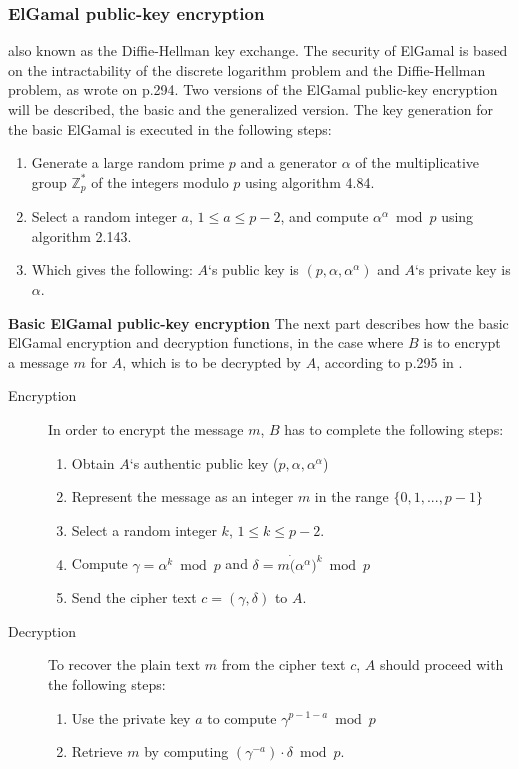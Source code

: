 \documentclass{acm_proc_article-sp}
\begin{document}
    \subsubsection{ElGamal public-key encryption}
    also known as the Diffie-Hellman key exchange. The security of ElGamal is based on the intractability of the discrete logarithm problem and the Diffie-Hellman problem, as \cite{handcrypt} wrote on p.294. Two versions of the ElGamal public-key encryption will be described, the basic and the generalized version. %
    The key generation for the basic ElGamal is executed in the following steps:
    \begin{enumerate} %
        \item Generate a large random prime $p$ and a generator $\alpha$ of the multiplicative group $\mathbb{Z}^*_p$ of the integers modulo $p$ using algorithm 4.84.
        \item Select a random integer $a$, $1 \leq a \leq p - 2$, and compute $\alpha^\alpha \bmod p$ using algorithm 2.143. %
        \item Which gives the following: $A$`s public key is $(p,\alpha, \alpha^\alpha)$ and $A$`s private key is $\alpha$.
    \end{enumerate}
    \textbf{Basic ElGamal public-key encryption}
    The next part describes how the basic ElGamal encryption and decryption functions, in the case where $B$ is to encrypt a message $m$ for $A$, which is to be decrypted by $A$, according to p.295 in \cite{handcrypt}.
    \begin{description}
        \item[Encryption] In order to encrypt the message $m$, $B$ has to complete the following steps: 
        \begin{enumerate}
            \item Obtain $A$`s authentic public key ($p, \alpha, \alpha^\alpha$) 
            \item Represent the message as an integer $m$ in the range $\{0, 1, ..., p - 1 \}$
            \item Select a random integer $k$, $1 \leq k \leq p - 2$.
            \item Compute $\gamma = \alpha^k \bmod p$ and $\delta = m \dot (\alpha^\alpha)^k \bmod p$
            \item Send the cipher text $c = (\gamma, \delta)$ to $A$.
        \end{enumerate}
        \item[Decryption] To recover the plain text $m$ from the cipher text $c$, $A$ should proceed with the following steps:
        \begin{enumerate}
            \item Use the private key $a$ to compute $\gamma^{p-1-a} \bmod p$
            \item Retrieve $m$ by computing $(\gamma^{-a}) \cdot \delta \bmod p$. 
        \end{enumerate}
    \end{description}
\end{document}
